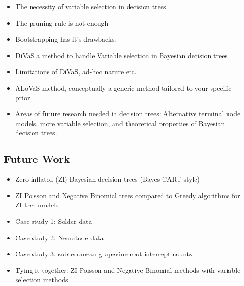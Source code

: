 \documentclass[12pt]{article}
\begin{document}
\begin{itemize}
\item The necessity of variable selection in decision trees. 
\item The pruning rule is not enough
\item Bootstrapping has it's drawbacks. 
\item DiVaS a method to handle Variable selection in Bayesian decision trees
\item Limitations of DiVaS, ad-hoc nature etc. 
\item ALoVaS method, conceptually a generic method tailored to your specific prior.
\item Areas of future research needed in decision trees: Alternative terminal node models, more variable selection, and theoretical properties of Bayesian decision trees.
\end{itemize}

\subsection{Future Work}

\begin{itemize}
\item Zero-inflated (ZI) Bayesian decision trees (Bayes CART style)
\item ZI Poisson and Negative Binomial trees compared to Greedy algorithms for ZI tree models. 
\item Case study 1: Solder data 
\item Case study 2: Nematode data 
\item Case study 3: subterranean grapevine root intercept counts
\item Tying it together: ZI Poisson and Negative Binomial methods with variable selection methods
\end{itemize}

\pagebreak



\pagebreak

%




\end{document}
